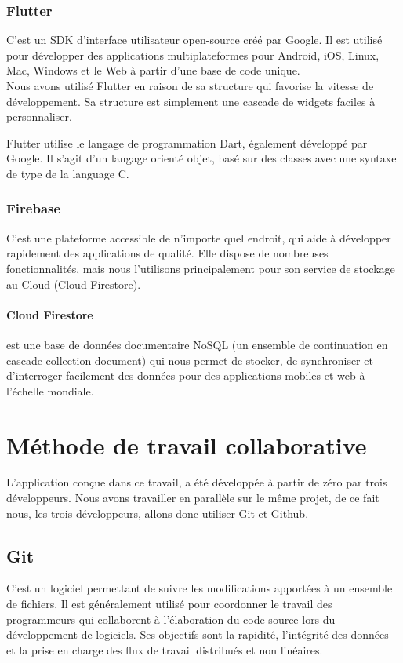 \documentclass[french, a4paper, 12pt]{report}
\begin{document}
			\subsubsection*{Flutter} C'est un SDK d'interface utilisateur open-source créé par Google. Il est utilisé pour développer des applications multiplateformes pour Android, iOS, Linux, Mac, Windows et le Web à partir d'une base de code unique.\\Nous avons utilisé Flutter en raison de sa structure qui favorise la vitesse de développement. Sa structure est simplement une cascade de widgets faciles à personnaliser.

Flutter utilise le langage de programmation Dart, également développé par Google. Il s'agit d'un langage orienté objet, basé sur des classes avec une syntaxe de type de la language C.
			\subsubsection*{Firebase} C'est une plateforme accessible de n'importe quel endroit, qui aide à développer rapidement des applications de qualité. Elle dispose de nombreuses fonctionnalités, mais nous l'utilisons principalement pour son service de stockage au Cloud (Cloud Firestore).\\
				\paragraph*{Cloud Firestore} est une base de données documentaire NoSQL (un ensemble de continuation en cascade collection-document) qui nous permet de stocker, de synchroniser et d'interroger facilement des données pour des applications mobiles et web à l'échelle mondiale.
	\section{Méthode de travail collaborative}
		L'application conçue dans ce travail, a été développée à partir de zéro par trois développeurs. Nous avons travailler en parallèle sur le même projet, de ce fait nous, les trois développeurs, allons donc utiliser Git et Github.

		\subsection*{Git} C'est un logiciel permettant de suivre les modifications apportées à un ensemble de fichiers. Il est généralement utilisé pour coordonner le travail des programmeurs qui collaborent à l'élaboration du code source lors du développement de logiciels. Ses objectifs sont la rapidité, l'intégrité des données et la prise en charge des flux de travail distribués et non linéaires.
\end{document}
